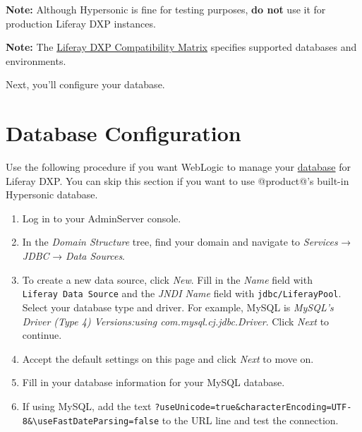 \noindent\hrulefill

\textbf{Note:} Although Hypersonic is fine for testing purposes,
\textbf{do not} use it for production Liferay DXP instances.

\noindent\hrulefill

\noindent\hrulefill

\textbf{Note:} The
\href{https://web.liferay.com/documents/14/21598941/Liferay+DXP+7.2+Compatibility+Matrix/b6e0f064-db31-49b4-8317-a29d1d76abf7?}{Liferay
DXP Compatibility Matrix} specifies supported databases and
environments.

\noindent\hrulefill

Next, you'll configure your database.

\section{Database Configuration}\label{database-configuration-3}

Use the following procedure if you want WebLogic to manage your
\href{/docs/7-2/deploy/-/knowledge_base/d/preparing-for-install\#using-the-built-in-data-source}{database}
for Liferay DXP. You can skip this section if you want to use
@product@'s built-in Hypersonic database.

\begin{enumerate}
\def\labelenumi{\arabic{enumi}.}
\item
  Log in to your AdminServer console.
\item
  In the \emph{Domain Structure} tree, find your domain and navigate to
  \emph{Services} → \emph{JDBC} → \emph{Data Sources}.
\item
  To create a new data source, click \emph{New}. Fill in the \emph{Name}
  field with \texttt{Liferay\ Data\ Source} and the \emph{JNDI Name}
  field with \texttt{jdbc/LiferayPool}. Select your database type and
  driver. For example, MySQL is \emph{MySQL's Driver (Type 4)
  Versions:using com.mysql.cj.jdbc.Driver}. Click \emph{Next} to
  continue.
\item
  Accept the default settings on this page and click \emph{Next} to move
  on.
\item
  Fill in your database information for your MySQL database.
\item
  If using MySQL, add the text
  \texttt{?useUnicode=true\&characterEncoding=UTF-8\&\textbackslash{}useFastDateParsing=false}
  to the URL line and test the connection.
\end{enumerate}

